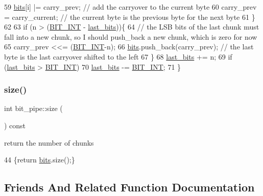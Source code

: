 \begin{DoxyCode}
59     \hyperlink{classbit__pipe_a86f38af1e9736b053728033490476b50}{bits}[i] |= carry\_prev; \textcolor{comment}{// add the carryover to the current byte}
60     carry\_prev = carry\_current; \textcolor{comment}{// the current byte is the previous byte for the next byte}
61   \}
62     
63   \textcolor{keywordflow}{if} (n > (\hyperlink{bitstream_8h_afcadf5aa65c5159bfb96c4d82ebc0a5d}{BIT\_INT} - \hyperlink{classbit__pipe_a0f3e84b02751803adaab499b5dad86fe}{last\_bits}))\{
64     \textcolor{comment}{// the LSB bits of the last chunk must fall into a new chunk, so I should push\_back a new chunk, which
       is zero for now}
65     carry\_prev <<= (\hyperlink{bitstream_8h_afcadf5aa65c5159bfb96c4d82ebc0a5d}{BIT\_INT}-n);
66     \hyperlink{classbit__pipe_a86f38af1e9736b053728033490476b50}{bits}.push\_back(carry\_prev); \textcolor{comment}{// the last byte is the last carryover shifted to the left }
67   \}
68   \hyperlink{classbit__pipe_a0f3e84b02751803adaab499b5dad86fe}{last\_bits} += n;
69   \textcolor{keywordflow}{if} (\hyperlink{classbit__pipe_a0f3e84b02751803adaab499b5dad86fe}{last\_bits} > \hyperlink{bitstream_8h_afcadf5aa65c5159bfb96c4d82ebc0a5d}{BIT\_INT})
70     \hyperlink{classbit__pipe_a0f3e84b02751803adaab499b5dad86fe}{last\_bits} -= \hyperlink{bitstream_8h_afcadf5aa65c5159bfb96c4d82ebc0a5d}{BIT\_INT};
71 \}
\end{DoxyCode}
\mbox{\label{classbit__pipe_a4bdc57f1f598bfad0eaa40860f17000c}} 
\subsubsection{\texorpdfstring{size()}{size()}}
{\footnotesize\ttfamily int bit\+\_\+pipe\+::size (\begin{DoxyParamCaption}{ }\end{DoxyParamCaption}) const\hspace{0.3cm}{\ttfamily [inline]}}



return the number of chunks 


\begin{DoxyCode}
44 \{\textcolor{keywordflow}{return} \hyperlink{classbit__pipe_a86f38af1e9736b053728033490476b50}{bits}.size();\}
\end{DoxyCode}


\subsection{Friends And Related Function Documentation}
\mbox{\label{classbit__pipe_ad424cca57ffb12b4cd748da4dcfe7b41}} 
